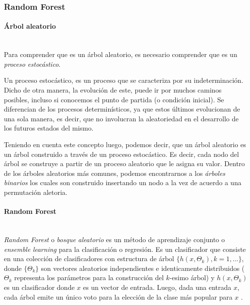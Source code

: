 \subsubsection{Random Forest}

	\paragraph{Árbol aleatorio} ~\\
	
	Para comprender que es un árbol aleatorio, es necesario comprender que es un \textit{proceso estocástico}.
	
	Un proceso estocástico, es un proceso que se caracteriza por su indeterminación. Dicho de otra manera, la evolución de este, puede ir por muchos caminos posibles, incluso si conocemos el punto de partida (o condición inicial). Se diferencian de los procesos determinísticos, ya que estos últimos evolucionan de una sola manera, es decir, que no involucran la aleatoriedad en el desarrollo de los futuros estados del mismo.	
	
	Teniendo en cuenta este concepto luego, podemos decir, que un árbol aleatorio es un árbol construido a través de un proceso estocástico. Es decir, cada nodo del árbol se construye a partir de un proceso aleatorio que le asigna su valor. Dentro de los árboles aleatorios más comunes, podemos encontrarnos a  los \textit{árboles binarios} los cuales son construido insertando un nodo a la vez de acuerdo a una permutación aletoria.

	\paragraph{Random Forest} ~\\

	\textit{Random Forest} o \textit{bosque aleatorio} es un método de aprendizaje conjunto o\textit{ ensemble learning} para la clasificación o regresión. Es un clasificador que consiste en una colección de clasificadores con estructura de árbol $\{h(x,\Theta_k), k = 1,\dots\}$, donde $\{\Theta_k\}$ son vectores aleatorios independientes e identicamente distribuidos ($\Theta_k$ representa los parámetros para la construcción del $k$-esimo árbol) y $h(x,\Theta_k)$ es un clasificador donde $x$ es un vector de entrada. Luego, dada una entrada $x$, cada árbol emite un único voto para la elección de la clase más popular para $x$ \cite{Breiman01}.

